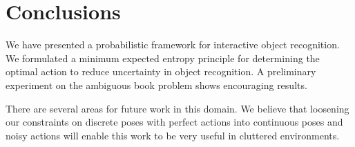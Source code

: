 \section{Conclusions}

We have presented a probabilistic framework for interactive object recognition. We formulated a minimum expected entropy principle for determining the optimal action to reduce uncertainty in object recognition. A preliminary experiment on the ambiguous book problem shows encouraging results.

    There are several areas for future work in this domain. We believe that loosening our constraints on discrete poses with perfect actions into continuous poses and noisy actions will enable this work to be very useful in cluttered environments.

   
